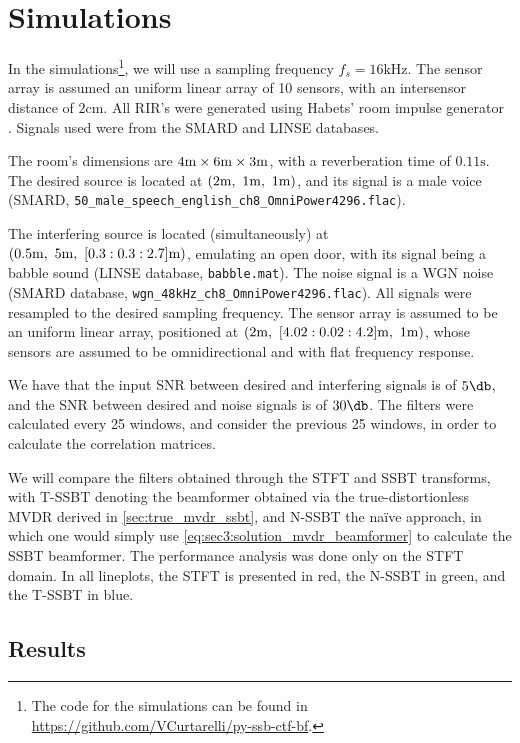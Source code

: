
\section{Simulations}
\label{sec:results}

In the simulations\footnote{The code for the simulations can be found in \url{https://github.com/VCurtarelli/py-ssb-ctf-bf}.}, we will use a sampling frequency $f_s = 16\si{\kilo\hertz}$. The sensor array is assumed an uniform linear array of 10 sensors, with an intersensor distance of $2\si{\cm}$. All RIR's were generated using Habets' room impulse generator \cite{habets_rir-generator}. Signals used were from the SMARD \cite{smard_database} and LINSE \cite{linse_database} databases.

The room's dimensions are $4\si{\meter}\times6\si{\meter}\times3\si{\meter}$, with a reverberation time of $0.11\si{\second}$. The desired source is located at $(2\si{\meter},~1\si{\meter},~1\si{\meter})$, and its signal is a male voice (SMARD, \texttt{50\_male\_speech\_english\_ch8\_OmniPower4296.flac}).

The interfering source is located (simultaneously) at $(0.5\si{\meter},~5\si{\meter},~[0.3:0.3:2.7]\si{\meter})$, emulating an open door, with its signal being a babble sound (LINSE database, \texttt{babble.mat}). The noise signal is a WGN noise (SMARD database, \texttt{wgn\_48kHz\_ch8\_OmniPower4296.flac}). All signals were resampled to the desired sampling frequency. The sensor array is assumed to be an uniform linear array, positioned at $(2\si{\meter},~[4.02:0.02:4.2]\si{\meter},~1\si{\meter})$, whose sensors are assumed to be omnidirectional and with flat frequency response.

We have that the input SNR between desired and interfering signals is of $5\dB$, and the SNR between desired and noise signals is of $30\dB$. The filters were calculated every 25 windows, and consider the previous 25 windows, in order to calculate the correlation matrices.

We will compare the filters obtained through the STFT and SSBT transforms, with T-SSBT denoting the beamformer obtained via the true-distortionless MVDR derived in \cref{sec:true_mvdr_ssbt}, and N-SSBT the naïve approach, in which one would simply use \cref{eq:sec3:solution_mvdr_beamformer} to calculate the SSBT beamformer. The performance analysis was done only on the STFT domain. In all lineplots, the STFT is presented in red, the N-SSBT in green, and the T-SSBT in blue.

\subsection{Results}


